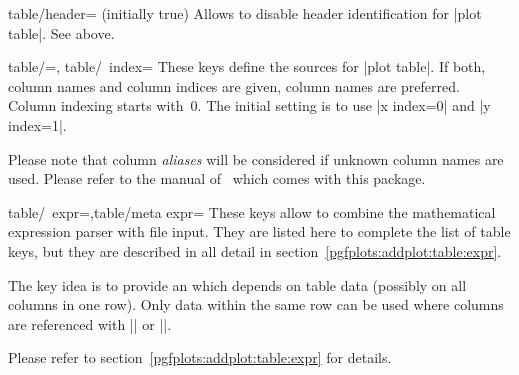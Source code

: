 \begin{pgfplotskey}{table/header= (initially true)}
	Allows to disable header identification for |plot table|. See above.
\end{pgfplotskey}
\begin{pgfplotsxykeylist}{table/\x=,
	table/\x\ index=}
	These keys define the sources for |plot table|. If both, column names and column indices are given, column names are preferred. Column indexing starts with~$0$. The initial setting is to use |x index=0| and |y index=1|. 

	Please note that column \emph{aliases} will be considered if unknown column names are used. Please refer to the manual of \PGFPlotstable\ which comes with this package.
\end{pgfplotsxykeylist}

\begin{pgfplotsxykeylist}{table/\x\ expr=,table/meta expr=}
	These keys allow to combine the mathematical expression parser with file input. They are listed here to complete the list of table keys, but they are described in all detail in section~\ref{pgfplots:addplot:table:expr}.

	The key idea is to provide an  which depends on table data (possibly on all columns in one row). Only data within the same row can be used where columns are referenced with |\thisrow| or |\thisrowno|. 
	
	Please refer to section~\ref{pgfplots:addplot:table:expr} for details.
\end{pgfplotsxykeylist}


